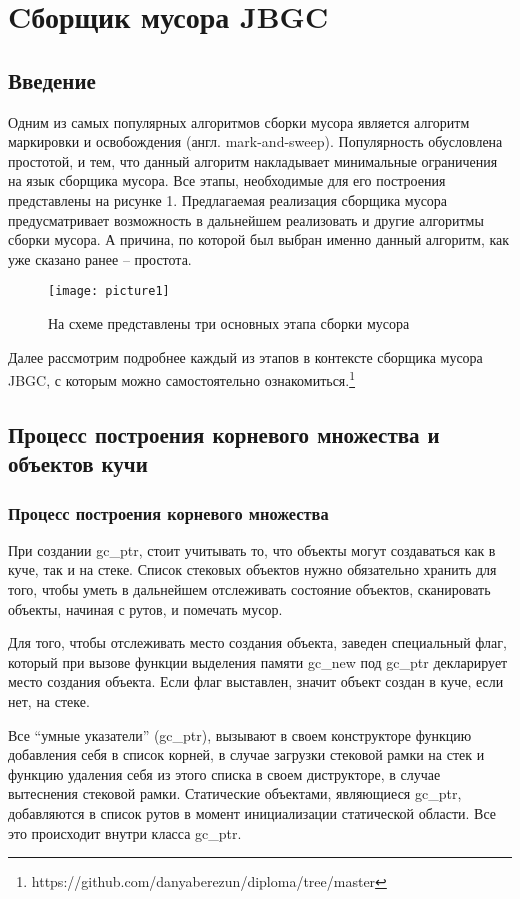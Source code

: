 

\section{Cборщик мусора JBGC}
\subsection{Введение}
Одним из самых популярных алгоритмов сборки мусора является  алгоритм маркировки и освобождения (англ. mark-and-sweep). Популярность обусловлена простотой, и тем, что данный алгоритм накладывает минимальные ограничения на язык сборщика мусора. Все этапы, необходимые для его построения представлены на рисунке 1.  Предлагаемая реализация сборщика мусора предусматривает возможность в дальнейшем реализовать и другие алгоритмы сборки мусора.  А причина, по которой был выбран именно данный алгоритм, как уже сказано ранее -- простота.


\begin{figure}[h!]
	\centering
	\texttt{[image: picture1]}
	\caption{На схеме представлены три основных этапа сборки мусора}
	\centering
\end{figure}

Далее рассмотрим подробнее каждый из этапов в контексте сборщика мусора JBGC,  с которым можно самостоятельно ознакомиться.\footnote{https://github.com/danyaberezun/diploma/tree/master}



\subsection{Процесс построения корневого множества и объектов кучи}
\subsubsection{Процесс построения корневого множества}
При создании gc\_ptr, стоит учитывать то, что объекты могут создаваться как в куче, так и на стеке. Список стековых объектов  нужно обязательно хранить для того, чтобы уметь в дальнейшем отслеживать состояние объектов, сканировать объекты, начиная с рутов, и помечать мусор. 

Для того, чтобы отслеживать место создания объекта, заведен специальный флаг, который при вызове функции выделения памяти gc\_new  под gc\_ptr декларирует место создания объекта. Если флаг выставлен, значит объект создан в куче, если нет, на стеке.

Все ``умные указатели'' (gc\_ptr), вызывают в своем конструкторе функцию добавления себя в список корней, в случае загрузки стековой рамки на стек и функцию удаления себя из этого списка в своем диструкторе, в случае вытеснения стековой рамки. Статические объектами, являющиеся gc\_ptr, добавляются в список рутов в момент инициализации статической области. Все это происходит внутри класса gc\_ptr.


